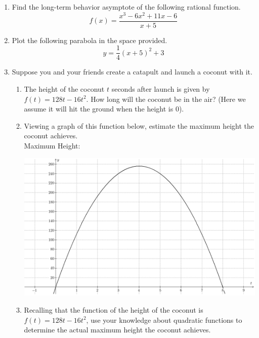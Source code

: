 \documentclass{article}
\begin{document}
\begin{enumerate}
\begin{center}
\CartesianPlane[axes=yes,h=10,w=10]
\end{center} \vspace{1cm}

\newpage

\item Find the long-term behavior asymptote of the following rational function. \[ f(x) = \frac{x^3 - 6x^2 + 11x - 6}{x + 5} \] \vspace{6cm}

\item Plot the following parabola in the space provided. \[ y = \frac{1}{4} \left(x + 5\right)^2 +3 \]

\begin{center}
\CartesianPlane[axes=yes,h=10,w=10]
\end{center} \vspace{1cm}

\newpage

\item Suppose you and your friends create a catapult and launch a coconut with it.
\begin{enumerate}
\item The height of the coconut $t$ seconds after launch is given by $f(t)=128t-16t^2$. How long will the coconut be in the air? (Here we assume it will hit the ground when the height is $0$).
\vspace{1in}
\item Viewing a graph of this function below, estimate the maximum height the coconut achieves. \vspace{.25in}\\ 
Maximum Height: \\ \vspace{.25in}
\begin{center}
\includegraphics[scale=.5]{ca/tex/coconut.png}
\end{center}
\item Recalling that the function of the height of the coconut is $f(t)=128t-16t^2$, use your knowledge about quadratic functions to determine the actual maximum height the coconut achieves.
\end{enumerate}
\end{enumerate}
\end{document}
